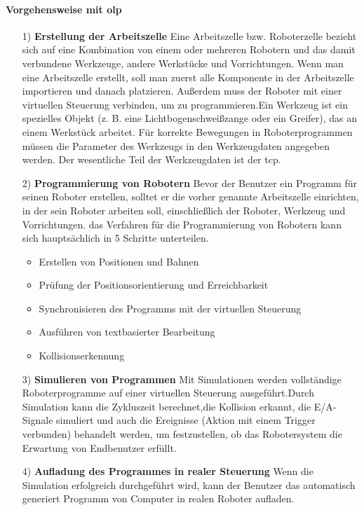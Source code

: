\documentclass[14pt,a4paper,titlepage]{article}
\begin{document}
	\paragraph{Vorgehensweise mit \acl{olp}}
	\begin{itemize}
		\item[1)]
		\textbf{Erstellung der Arbeitszelle}
		\linebreak
		Eine Arbeitszelle bzw. Roboterzelle bezieht sich auf eine Kombination von einem oder mehreren Robotern und das damit verbundene Werkzeuge, andere Werkstücke und Vorrichtungen. Wenn man eine Arbeitszelle erstellt, soll man zuerst alle Komponente in der Arbeitszelle importieren und danach platzieren. Außerdem muss der Roboter mit einer virtuellen Steuerung verbinden, um zu programmieren.Ein Werkzeug ist ein spezielles Objekt (z. B. eine Lichtbogenschweißzange oder
		ein Greifer), das an einem Werkstück arbeitet. Für korrekte Bewegungen in
		Roboterprogrammen müssen die Parameter des Werkzeugs in den Werkzeugdaten
		angegeben werden. Der wesentliche Teil der Werkzeugdaten ist der \acf{tcp}.
		
		\item[2)] 
		\textbf{Programmierung von Robotern}
		\linebreak
		 Bevor der Benutzer ein Programm für seinen Roboter erstellen, solltet er die vorher genannte Arbeitszelle
		 einrichten, in der sein Roboter arbeiten soll, einschließlich der Roboter, Werkzeug
		 und Vorrichtungen.
		 \bigbreak
		 das Verfahren für die Programmierung von Robotern kann sich hauptsächlich in 5 Schritte unterteilen.
		 \begin{itemize}
		 	\item Erstellen von Positionen
		 	und Bahnen
		 	\item Prüfung der Positionsorientierung und Erreichbarkeit
		 	\item Synchronisieren des Programms
		 	mit der virtuellen
		 	Steuerung
		 	\item Ausführen von textbasierter
		 	Bearbeitung
		 	\item Kollisionserkennung
		 \end{itemize} 
	 	\item[3)]
	 	\textbf{Simulieren von Programmen}
	 	\linebreak
	 	Mit Simulationen werden vollständige Roboterprogramme auf einer virtuellen Steuerung ausgeführt.Durch Simulation kann die Zykluszeit berechnet,die Kollision erkannt, die E/A-Signale simuliert und auch die Ereignisse (Aktion mit einem Trigger verbunden) behandelt werden, um festzustellen, ob das Robotersystem die Erwartung von Endbenutzer erfüllt.
	 	
	 	\item [4)]
	 	\textbf{Aufladung des Programmes in realer Steuerung}
	 	\linebreak
	 	Wenn die Simulation erfolgreich durchgeführt wird, kann der Benutzer das automatisch generiert Programm von Computer in realen Roboter aufladen.   
	\end{itemize}
\end{document}
